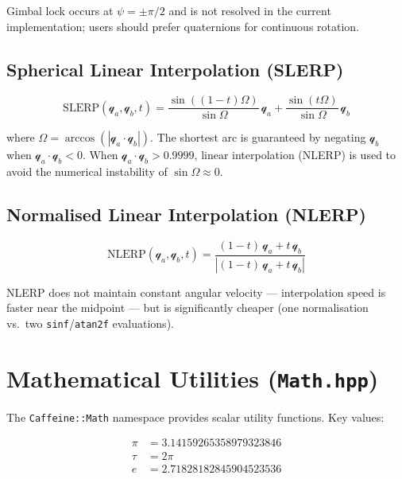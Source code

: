 Gimbal lock occurs at $\psi = \pm\pi/2$ and is not resolved in the current
implementation; users should prefer quaternions for continuous rotation.

\subsection{Spherical Linear Interpolation (SLERP)}

\begin{equation}
\text{SLERP}(\mathcal{q}_a, \mathcal{q}_b, t)
= \frac{\sin((1-t)\Omega)}{\sin\Omega}\,\mathcal{q}_a
+ \frac{\sin(t\Omega)}{\sin\Omega}\,\mathcal{q}_b
\label{eq:slerp}
\end{equation}

where $\Omega = \arccos(|\mathcal{q}_a \cdot \mathcal{q}_b|)$.
The shortest arc is guaranteed by negating $\mathcal{q}_b$ when
$\mathcal{q}_a \cdot \mathcal{q}_b < 0$.
When $\mathcal{q}_a \cdot \mathcal{q}_b > 0.9999$, linear interpolation
(NLERP) is used to avoid the numerical instability of $\sin\Omega \approx 0$.

\subsection{Normalised Linear Interpolation (NLERP)}

\begin{equation}
\text{NLERP}(\mathcal{q}_a, \mathcal{q}_b, t)
= \frac{(1-t)\,\mathcal{q}_a + t\,\mathcal{q}_b}{|(1-t)\,\mathcal{q}_a + t\,\mathcal{q}_b|}
\label{eq:nlerp}
\end{equation}

NLERP does not maintain constant angular velocity --- interpolation speed
is faster near the midpoint --- but is significantly cheaper (one
normalisation vs.\ two \texttt{sinf}/\texttt{atan2f} evaluations).

\section{Mathematical Utilities (\texttt{Math.hpp})}

The \texttt{Caffeine::Math} namespace provides scalar utility functions.
Key values:

\begin{align*}
  \pi &= 3.14159265358979323846 \\
  \tau &= 2\pi \\
  e &= 2.71828182845904523536
\end{align*}

